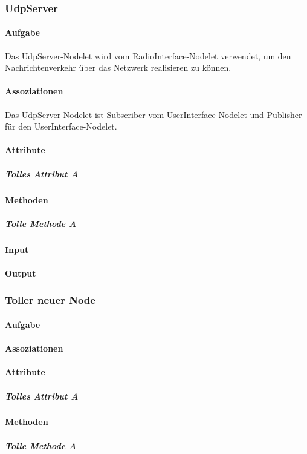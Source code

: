 \documentclass[a4paper, 12pt, titlepage]{scrartcl}
\begin{document}
		    \subsubsection{UdpServer}
			\label{udpserver}
				\paragraph{Aufgabe} Das UdpServer-Nodelet wird vom RadioInterface-Nodelet verwendet, um den Nachrichtenverkehr über das Netzwerk realisieren zu können. 
				\paragraph{Assoziationen} Das UdpServer-Nodelet ist Subscriber vom UserInterface-Nodelet und Publisher für den UserInterface-Nodelet. 
				\paragraph{Attribute}
					\subparagraph{Tolles Attribut A}
				\paragraph{Methoden}
					\subparagraph{Tolle Methode A}
				\paragraph{Input}
				\paragraph{Output}
				
			\subsubsection{Toller neuer Node}
			\label{controller_ui}
				\paragraph{Aufgabe}
				\paragraph{Assoziationen}
				\paragraph{Attribute}
					\subparagraph{Tolles Attribut A}
				\paragraph{Methoden}
					\subparagraph{Tolle Methode A}
\end{document}
